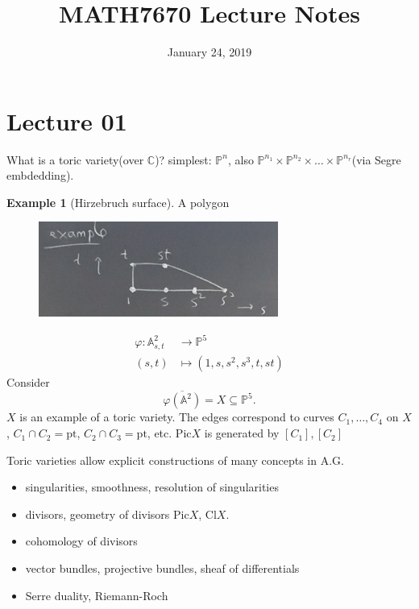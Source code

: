 \documentclass[a4paper,12pt]{amsart}
\title{MATH7670 Lecture Notes}
\author{}
\date{January 24, 2019}
\newcommand{\CC}{\mathbb{C}}
\newcommand{\PP}{\mathbb{P}}
\begin{document}
\maketitle
\newtheorem{Lemma}{Lemma}
\newtheorem{Proposition}{Proposition}[section]
\newtheorem{Theorem}{Theorem}[section]
\newtheorem{Corollary}{Corollary}
\newtheorem*{Conjecture}{Conjecture}

\theoremstyle{definition}
\newtheorem*{Problem}{Problem}
\newtheorem*{Def}{Definition}
\newtheorem{Eg}{Example}[section]

\theoremstyle{remark}
\newtheorem*{Remark}{Remark}
\newtheorem*{Caution}{\bf{Caution}}
\newtheorem*{Fact}{Fact}


\section{Lecture 01}

What is a toric variety(over $\CC$)? simplest: $\PP^n$, also $\PP^{n_1}\times\PP^{n_2}\times\dots\times\PP^{n_r}$(via Segre embdedding).

\begin{Eg}[Hirzebruch surface]
A polygon
\begin{figure}[h]
\centering
\includegraphics[width=0.7\textwidth]{pic/lec01pic01}
\end{figure}
\begin{align*}
\varphi:\mathbb{A}^2_{s,t}&\rightarrow\PP^5\\
(s,t)&\mapsto(1,s,s^2,s^3,t,st)
\end{align*}
Consider
\begin{equation*}
\overline{\varphi(\mathbb{A}^2)}=X\subseteq\PP^5.
\end{equation*}
$X$ is an example of a toric variety.
The edges correspond to curves $C_1,\dots,C_4$ on $X$, $C_1\cap C_2=\text{pt}$, $C_2\cap C_3=\text{pt}$, etc. $\text{Pic}X$ is generated by $[C_1],[C_2]$
\end{Eg}
Toric varieties allow explicit constructions of many concepts in A.G.
\begin{itemize}
\item singularities, smoothness, resolution of singularities 
\item divisors, geometry of divisors $\text{Pic}X$, $\text{Cl}X$.
\item cohomology of divisors
\item vector bundles, projective bundles, sheaf of differentials
\item  Serre duality, Riemann-Roch
\end{itemize}
\end{document}
